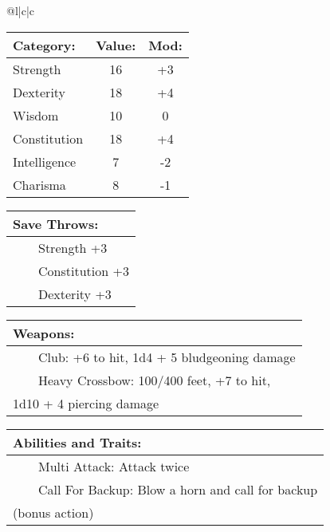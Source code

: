 \documentclass[11pt]{article}
\newcommand{\tabitem}{~~\llap{--}~~}
\begin{document}
\begin{multicols}{2}
\noindent \begin{tabularx}{\linewidth}{@{}l|c|c}
 \\
\hline
		\end{tabularx}
\noindent \begin{tabular}{@{}l|c|c}
\textbf{Category:} 			& \textbf{Value:} 	& \textbf{Mod:} \\
\hline
Strength 					& 16 					& +3		\\
Dexterity 					& 18 					& +4		\\
Wisdom 						& 10					& 0			\\
Constitution 				& 18 					& +4		\\
Intelligence 				& 7		 				& -2		\\
Charisma 					& 8		 				& -1
		\end{tabular}

\vspace{4mm}

\noindent \begin{tabularx}{\linewidth}{@{}l}
{\Large \textbf{Save Throws:}} \\
\hline
\tabitem Strength +3 \\
\tabitem Constitution +3 \\
\tabitem Dexterity +3
		\end{tabularx}

\vspace{4mm}

\noindent \begin{tabularx}{\linewidth}{@{}l}
{\Large \textbf{Weapons:}} \\
\hline
\tabitem Club: +6 to hit, 1d4 + 5 bludgeoning damage \\
\tabitem Heavy Crossbow: 100/400 feet, +7 to hit, \\
1d10 + 4 piercing damage
		\end{tabularx}

\vspace{4mm}

\noindent \begin{tabularx}{\linewidth}{@{}l}
{\Large \textbf{Abilities and Traits:}} \\
\hline
\tabitem Multi Attack: Attack twice \\
\tabitem Call For Backup: Blow a horn and call for backup \\
(bonus action)
		\end{tabularx}
	\end{multicols}
\end{document}

